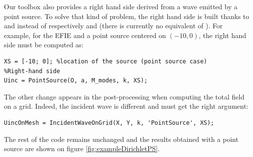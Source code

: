 Our toolbox \mudiff also provides a right hand side derived from a wave emitted by a point source. To solve that kind of problem, the right hand side is built thanks to \PointSource and \DnPointSource instead of respectively \PlaneWave and \DnPlaneWave (there is currently no equivalent of \PlaneWavePrecond). For example, for the EFIE and a point source centered on $(-10,0)$, the right hand side must be computed as:
\begin{lstlisting}
XS = [-10; 0]; %location of the source (point source case)
%Right-hand side
Uinc = PointSource(O, a, M_modes, k, XS);
\end{lstlisting}
The other change appears in the post-processing when computing the total field on a grid. Indeed, the incident wave is different and \IncidentWaveOnGrid must get the right argument:
\begin{lstlisting}
UincOnMesh = IncidentWaveOnGrid(X, Y, k, 'PointSource', XS);
\end{lstlisting}

The rest of the code remains unchanged and the results obtained with a point source are shown on figure \ref{fig:exampleDirichletPS}.

